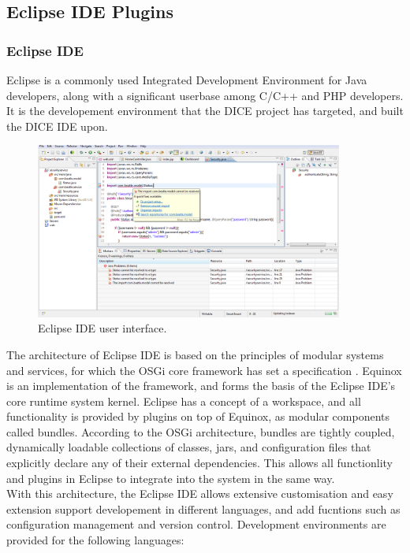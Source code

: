 \newpage
\subsection{Eclipse IDE Plugins}
\subsubsection{Eclipse IDE}
Eclipse is a commonly used Integrated Development Environment for Java developers, along with a significant userbase among C/C++ and PHP developers. \cite{eclipseide} It is the developement environment that the DICE project has targeted, and built the DICE IDE upon. \cite{dicetools}\\
\begin{figure}[h]
\centering
\caption{Eclipse IDE user interface. \cite{eclipsescreenshot}}
\label{fig:eclipse}
\includegraphics[width=0.9\textwidth]{images/eclipse.png}
\end{figure}
The architecture of Eclipse IDE is based on the principles of modular systems and services, for which the OSGi core framework has set a specification \cite{osgi}. Equinox is an implementation of the framework, and forms the basis of the Eclipse IDE's core runtime system kernel. Eclipse has a concept of a workspace, and all functionality is provided by plugins on top of Equinox, as modular components called bundles. According to the OSGi architecture, bundles are tightly coupled, dynamically loadable collections of classes, jars, and configuration files that explicitly declare any of their external dependencies. This allows all functionlity and plugins in Eclipse to integrate into the system in the same way.\\
With this architecture, the Eclipse IDE allows extensive customisation and easy extension support developement in different languages, and add fucntions such as configuration management and version control. Development environments are provided for the following languages: \cite{eclipsepkgs}
